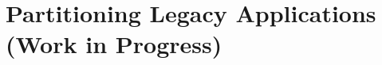 \declarecommand{\sysname}{\civet{}}

\chapter{Partitioning Legacy \java{} Applications\\ (Work in Progress)}
\label{chap:civet}







%

